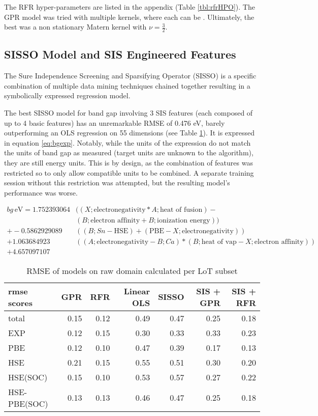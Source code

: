 The RFR hyper-parameters are listed in the appendix (Table \ref{tbl:rfrHPO}).
The GPR model was tried with multiple kernels, where each can be .
Ultimately, the best was a non stationary Matern kernel with \(\nu = \frac{3}{2}\).

\subsection{SISSO Model and SIS Engineered Features}
\label{sec:orgf476608}
The Sure Independence Screening and Sparsifying Operator (SISSO) is a specific combination of multiple data mining techniques chained together resulting in a symbolically expressed regression model.
\autocite{ouyang-2018-sisso,ghiringhelli-2017-learn-physic} 

The best SISSO model for band gap involving 3 SIS features (each composed of up to 4 basic features) has an unremarkable RMSE of 0.476 eV, barely outperforming an OLS regression on 55 dimensions (see Table \ref{tbl:LoTscores}).
It is expressed in equation \ref{eq:bgexp}.
Notably, while the units of the expression do not match the units of band gap as measured (target units are unknown to the algorithm), they are still energy units.
This is by design, as the combination of features was restricted so to only allow compatible units to be combined.
A separate training session without this restriction was attempted, but the resulting model's performance was worse.

\begin{align}
\label{eq:bgexp}
bg\,\si{\electronvolt} = 1.752393064 &((X;\mbox{electronegativity}*A;\mbox{heat of fusion})-\nonumber\\&(B;\mbox{electron affinity}+B;\mbox{ionization energy}))\nonumber\\+-0.5862929089 &((B;Sn-\mbox{HSE})+(\mbox{PBE}-X;\mbox{electronegativity}))\nonumber\\+1.063684923 &((A;\mbox{electronegativity}-B;Ca)*(B;\mbox{heat of vap}-X;\mbox{electron affinity}))\nonumber\\+4.657097107
\end{align}

\begin{table}[htbp]
\caption{\label{tbl:LoTscores} RMSE of models on raw domain calculated per LoT subset}
\centering
\begin{tabular}{lrrrrrr}
rmse scores & GPR & RFR & Linear OLS & SISSO & SIS + GPR & SIS + RFR\\[0pt]
\hline
total & 0.15 & 0.12 & 0.49 & 0.47 & 0.25 & 0.18\\[0pt]
EXP & 0.12 & 0.15 & 0.30 & 0.33 & 0.33 & 0.23\\[0pt]
PBE & 0.12 & 0.10 & 0.47 & 0.39 & 0.17 & 0.13\\[0pt]
HSE & 0.21 & 0.15 & 0.55 & 0.51 & 0.30 & 0.20\\[0pt]
HSE(SOC) & 0.15 & 0.10 & 0.53 & 0.57 & 0.27 & 0.22\\[0pt]
HSE-PBE(SOC) & 0.13 & 0.13 & 0.46 & 0.47 & 0.25 & 0.18\\[0pt]
\end{tabular}
\end{table}

